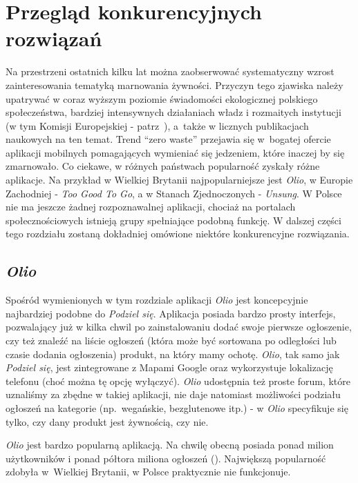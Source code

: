 \documentclass[licencjacka]{pracamgr}
\begin{document}
\chapter{Przegląd konkurencyjnych rozwiązań}\label{r:konkurencja}

Na przestrzeni ostatnich kilku lat można zaobserwować systematyczny wzrost zainteresowania tematyką marnowania żywności. Przyczyn tego zjawiska należy upatrywać w coraz wyższym poziomie świadomości ekologicznej polskiego społeczeństwa, bardziej intensywnych działaniach władz i rozmaitych instytucji (w tym Komisji Europejskiej - patrz~\cite{ec}), a~także w licznych publikacjach naukowych na ten temat. Trend ``zero waste'' przejawia się w~bogatej ofercie aplikacji mobilnych pomagających wymieniać się jedzeniem, które inaczej by się zmarnowało. Co ciekawe, w różnych państwach popularność zyskały różne aplikacje. Na przykład w Wielkiej Brytanii najpopularniejsze jest \textit{Olio}, w Europie Zachodniej - \textit{Too Good To Go}, a w Stanach Zjednoczonych - \textit{Unsung}. W Polsce nie ma jeszcze żadnej rozpoznawalnej aplikacji, chociaż na portalach społecznościowych istnieją grupy spełniające podobną funkcję. W dalszej części tego rozdziału zostaną dokładniej omówione niektóre konkurencyjne rozwiązania.

\section{\textit{Olio}}
Spośród wymienionych w tym rozdziale aplikacji \textit{Olio} jest koncepcyjnie najbardziej podobne do \textit{Podziel się}. Aplikacja posiada bardzo prosty interfejs, pozwalający już w kilka chwil po zainstalowaniu dodać swoje pierwsze ogłoszenie, czy też znaleźć na liście ogłoszeń (która może być sortowana po odległości lub czasie dodania ogłoszenia) produkt, na który mamy ochotę. \textit{Olio}, tak samo jak \textit{Podziel się}, jest zintegrowane z Mapami Google oraz wykorzystuje lokalizację telefonu (choć można tę opcję wyłączyć). \textit{Olio} udostępnia też proste forum, które uznaliśmy za zbędne w takiej aplikacji, nie daje natomiast możliwości podziału ogłoszeń na kategorie (np.\ wegańskie, bezglutenowe itp.) - w \textit{Olio} specyfikuje się tylko, czy dany produkt jest żywnością, czy nie.

\textit{Olio} jest bardzo popularną aplikacją. Na chwilę obecną posiada ponad milion użytkowników i ponad półtora miliona ogłoszeń (\cite{olio}). Największą popularność zdobyła w~Wielkiej Brytanii, w Polsce praktycznie nie funkcjonuje.
\end{document}
